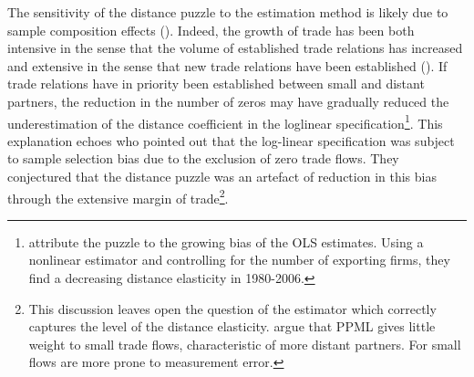 \documentclass[12pt,twoside,a4paper,notitlepage]{article}
\begin{document}
The sensitivity of the distance puzzle to the estimation method is likely due to sample composition effects (\cite{Head2013,Larch2016}).
Indeed, the growth of trade has been both intensive in the sense that the volume of established trade relations has increased and extensive in the sense that new trade relations have been established (\cite{Helpman2008, Baldwin2011}).
If trade relations have in priority been established between small and distant partners, the reduction in the number of zeros may have gradually reduced the underestimation of the distance coefficient in the loglinear specification\footnote{\cite{Larch2016} attribute the puzzle to the growing bias of the OLS estimates.
Using a nonlinear estimator and controlling for the number of exporting firms, they find a decreasing distance elasticity in 1980-2006.}.
This explanation echoes \cite{Felbermayr2006} who pointed out that the log-linear specification was subject to sample selection bias due to the exclusion of zero trade flows.
They conjectured that the distance puzzle was an artefact of reduction in this bias through the extensive margin of trade\footnote{This discussion leaves open the question of the estimator which correctly captures the level of the distance elasticity.
\cite{Head2013} argue that PPML gives little weight to small trade flows, characteristic of more distant partners.
For \cite{SantosSilva2006} small flows are more prone to measurement error.}.
\end{document}
